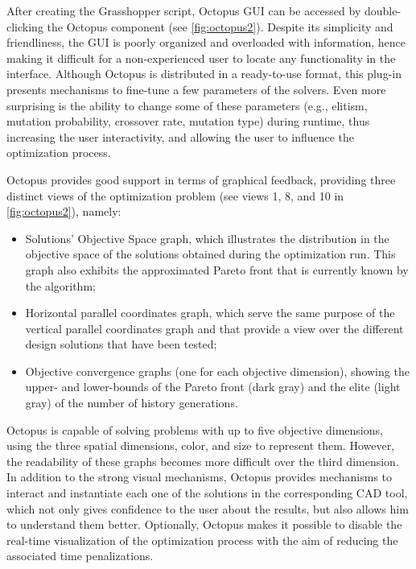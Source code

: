 	After creating the Grasshopper script, Octopus \ac{GUI} can be accessed by double-clicking the Octopus component (see \cref{fig:octopus2}). Despite its simplicity and friendliness, the \ac{GUI} is poorly organized and overloaded with information, hence making it difficult for a non-experienced user to locate any functionality in the interface. Although Octopus is distributed in a ready-to-use format, this plug-in presents mechanisms to fine-tune a few parameters of the solvers. Even more surprising is the ability to change some of these parameters (e.g., elitism, mutation probability, crossover rate, mutation type) during runtime, thus increasing the user interactivity, and allowing the user to influence the optimization process.
	
	Octopus provides good support in terms of graphical feedback, providing three distinct views of the optimization problem (see views 1, 8, and 10 in \cref{fig:octopus2}), namely:
	\begin{itemize}
		\item Solutions' Objective Space graph, which illustrates the distribution in the objective space of the solutions obtained during the optimization run. This graph also exhibits the approximated Pareto front that is currently known by the algorithm;
		\item Horizontal parallel coordinates graph, which serve the same purpose of the vertical parallel coordinates graph and that provide a view over the different design solutions that have been tested;
		\item Objective convergence graphs (one for each objective dimension), showing the upper- and lower-bounds of the Pareto front (dark gray) and the elite (light gray) of the number of history generations.
	\end{itemize} 
	
	Octopus is capable of solving problems with up to five objective dimensions, using the three spatial dimensions, color, and size to represent them. However, the readability of these graphs becomes more difficult over the third dimension. In addition to the strong visual mechanisms, Octopus provides mechanisms to interact and instantiate each one of the solutions in the corresponding \ac{CAD} tool, which not only gives confidence to the user about the results, but also allows him to understand them better. Optionally, Octopus makes it possible to disable the real-time visualization of the optimization process with the aim of reducing the associated time penalizations.
	
